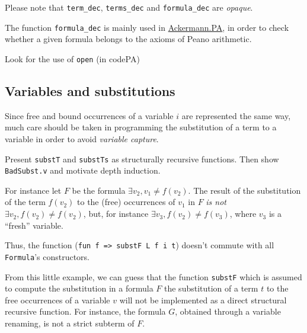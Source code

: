 

\begin{remark}
Please note that \texttt{term\_dec}, \texttt{terms\_dec} and
\texttt{formula\_dec} are \emph{opaque}. 

The function \texttt{formula\_dec} is mainly used in
\href{../theories/html/hydras.Ackermann.PA.html}{Ackermann.PA}, in order to check whether a given formula belongs to the axioms of Peano arithmetic.
\begin{todo}
  Look for the use of \texttt{open}  (in codePA)
\end{todo}

\end{remark}


\subsection{Variables and substitutions}

Since free and bound occurrences of a variable $i$ are represented the same way, much care should be taken in programming the substitution of a term to a variable in order to avoid \emph{variable capture}.

\begin{todo}
  Present \texttt{substT} and \texttt{substTs} as structurally recursive functions. Then show \texttt{BadSubst.v} and motivate
 depth induction.
\end{todo}






For instance let $F$ be the formula 
$\exists v_2, v_1 \not= f(v_2)$. The result of the substitution 
of the term $f(v_2)$ to the (free) occurrences of $v_1$ in $F$
 \emph{is not} $\exists v_2, f(v_2) \not= f(v_2)$, but, for instance $\exists v_3, f(v_2) \not= f(v_3)$, where $v_3$ is a ``fresh'' variable.



Thus, the function (\texttt{fun f => substF L f i t}) doesn't commute with all \texttt{Formula}'s constructors.


From this little example, we can guess that the function
\texttt{substF} which is assumed to compute the substitution in a formula $F$ the substitution of a term $t$ to the free occurrences of a variable $v$ will not be implemented as a direct structural recursive function. For instance, the formula $G$, obtained through a variable renaming, is not a strict subterm of $F$.

